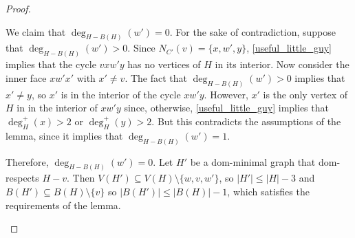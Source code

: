 \documentclass{article}
\newcommand{\pat}[1]{\textcolor{red}{PM: #1}}
\theoremstyle{definition}
\begin{document}
\begin{proof}
\begin{enumerate}[(i)]
    We claim that $\deg_{H-B(H)}(w')=0$. For the sake of contradiction, suppose that $\deg_{H-B(H)}(w')>0$.  Since $N_{C'}(v)=\{x,w',y\}$, \cref{useful_little_guy} implies that the cycle $vxw'y$ has no vertices of $H$ in its interior.  Now consider the inner face $xw'x'$ with $x'\neq v$. The fact that $\deg_{H-B(H)}(w')>0$ implies that $x'\neq y$, so $x'$ is in the interior of the cycle $xw'y$. However, $x'$ is the only vertex of $H$ in in the interior of $xw'y$ since, otherwise, \cref{useful_little_guy} implies that $\deg^+_H(x)>2$ or $\deg^+_H(y)>2$.  But this contradicts the assumptions of the lemma, since it implies that $\deg_{H-B(H)}(w')=1$.

    Therefore, $\deg_{H-B(H)}(w')=0$. Let $H'$ be a dom-minimal graph that dom-respects $H-v$.  Then $V(H')\subseteq V(H)\setminus\{w,v,w'\}$, so $|H'|\le |H|-3$ and $B(H')\subseteq B(H)\setminus\{v\}$ so $|B(H')|\le |B(H)|-1$, which satisfies the requirements of the lemma. \qedhere




\end{enumerate}
\end{proof}
\end{document}
